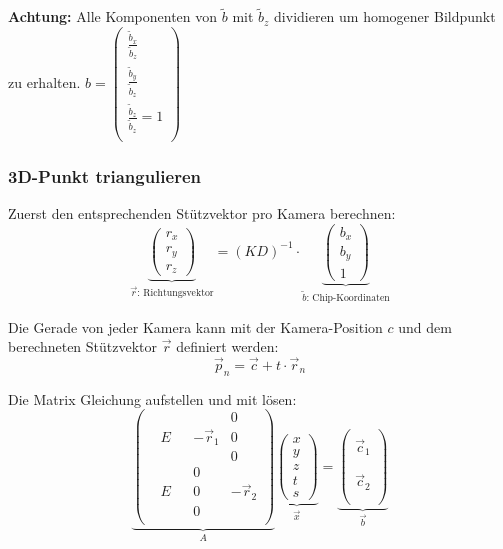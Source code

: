 \noindent \textbf{Achtung:} Alle Komponenten von $\tilde{b}$ mit $\tilde{b}_z$ dividieren um homogener Bildpunkt zu erhalten.
$
b = \begin{pmatrix}
	\frac{\tilde{b}_x}{\tilde{b}_z} \\
	\frac{\tilde{b}_y}{\tilde{b}_z} \\
	\frac{\tilde{b}_z}{\tilde{b}_z}  = 1\\
\end{pmatrix}
$

\subsubsection{3D-Punkt triangulieren}
Zuerst den entsprechenden Stützvektor pro Kamera berechnen:
\[ 
\underbrace{
	\begin{pmatrix}
		r_x \\ r_y \\ r_z
\end{pmatrix}}_{\vec{r}\text{: Richtungsvektor}}
= (KD)^{-1} \cdot
\underbrace{
	\begin{pmatrix}
		b_x \\ b_y \\ 1
\end{pmatrix}}_{\tilde{b}\text{: Chip-Koordinaten}
}
\]

\noindent Die Gerade von jeder Kamera kann mit der Kamera-Position $c$ und dem berechneten Stützvektor $\vec{r}$ definiert werden:
\[
	\vec{p}_n = \vec{c} + t \cdot \vec{r}_n
\]

\noindent Die Matrix Gleichung aufstellen und mit  lösen:
\[
\underbrace{
	\begin{pmatrix}
		& & & & 0 \\
		& E & & -\vec{r}_1 & 0 \\
		& & & & 0 \\	
		& & & 0 & \\
		& E & & 0 & -\vec{r}_2 \\
		& & & 0 & \\
	\end{pmatrix}
}_{A}
\underbrace{
	\begin{pmatrix}
		x \\
		y \\
		z \\	
		t \\
		s 
	\end{pmatrix}
}_{\vec{x}}
=
\underbrace{
	\begin{pmatrix}
	    \\
		\vec{c}_1 \\
		\\	
		\\
	    \vec{c}_2 \\
		\\
	\end{pmatrix}
}_{\vec{b}}
\]